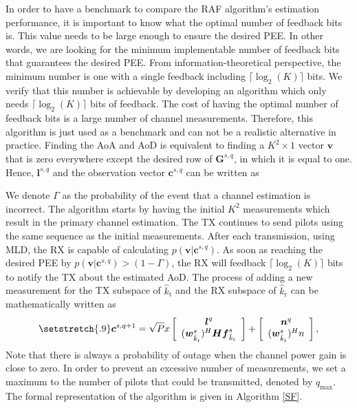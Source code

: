\documentclass{ieeeaccess}
\begin{document}
In order to have a benchmark to compare the RAF algorithm’s estimation performance, it is important to know what the optimal number of feedback bits is. This value needs to be large enough to ensure the desired PEE. In other words, we are looking for the minimum implementable number of feedback bits that guarantees the desired PEE. From information-theoretical perspective, the minimum number is one with a single feedback including  $\lceil\log_2(K)\rceil$ bits\cite{ref10}. We verify that this number is achievable by developing an algorithm which only needs $\lceil\log_2(K)\rceil$ bits of feedback. The cost of having the optimal number of feedback bits is a large number of channel measurements. Therefore, this algorithm is just used as a benchmark and can not be a realistic alternative in practice. Finding the AoA and AoD is equivalent to finding a $K^2 \times 1$ vector $\boldsymbol{v}$ that is zero everywhere except the desired row of $\boldsymbol{G}^{s,q}$, in which it is equal to one. Hence, $\boldsymbol{l}^{s,q}$ and the observation vector $\boldsymbol{c}^{s,q}$ can be written as



We denote $\Gamma$ as the probability of the event that a channel estimation is incorrect. The algorithm starts by having the initial $K^2$ measurements which result in the primary channel estimation. The TX continues to send pilots using the same sequence as the initial measurements. After each transmission, using MLD, the RX is capable of calculating $p(\boldsymbol{v}|\boldsymbol{c}^{s,q})$. As soon as reaching the desired PEE by $p(\boldsymbol{v}|\boldsymbol{c}^{s,q})> (1 - \Gamma)$, the RX will feedback $\lceil\log_2(K)\rceil$ bits to notify the TX about the estimated AoD. The process of adding a new measurement for the TX subspace of $\hat{k}_\textrm{t}$ and the RX subspace of $\hat{k}_\textrm{r}$ can be mathematically written as
\begin{align}\label{n29}
\setstretch{.9}
\boldsymbol{c}^{s,q+1} = \sqrt{P} x \left[\begin{array}{ccc} \boldsymbol{l}^{q} \\ (\boldsymbol{w}_{\hat{k}_\textrm{r}}^{s})^H  \boldsymbol{H} \boldsymbol{f}_{\hat{k}_\textrm{t}}^{s} \end{array}
\right] +\left[\begin{array}{ccc} \boldsymbol{n}^{q}  \\ (\boldsymbol{w}_{\hat{k}_\textrm{r}}^{s})^H  n   \end{array}\right],
\end{align}
Note that there is always a probability of outage when the channel power gain is close to zero. In order to prevent an excessive number of measurements, we set a maximum to the number of pilots that could be transmitted, denoted by $q_{\textrm{max}}$. The formal representation of the algorithm is given in Algorithm \ref{SF}.
\end{document}
